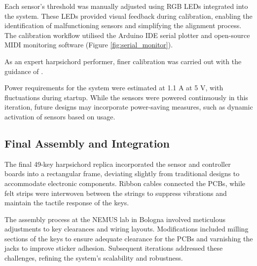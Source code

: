 Each sensor's threshold was manually adjusted using RGB LEDs integrated into the system. These LEDs provided visual feedback during calibration, enabling the identification of malfunctioning sensors and simplifying the alignment process. The calibration workflow utilised the Arduino IDE serial plotter and open-source MIDI monitoring software (Figure \ref{fig:serial_monitor}). 


As an expert harpsichord performer, finer calibration was carried out with the guidance of .

Power requirements for the system were estimated at 1.1 A at 5 V, with fluctuations during startup. While the sensors were powered continuously in this iteration, future designs may incorporate power-saving measures, such as dynamic activation of sensors based on usage.

\subsection{Final Assembly and Integration}

The final 49-key harpsichord replica incorporated the sensor and controller boards into a rectangular frame, deviating slightly from traditional designs to accommodate electronic components. Ribbon cables connected the PCBs, while felt strips were interwoven between the strings to suppress vibrations and maintain the tactile response of the keys.

The assembly process at the NEMUS lab in Bologna involved meticulous adjustments to key clearances and wiring layouts. Modifications included milling sections of the keys to ensure adequate clearance for the PCBs and varnishing the jacks to improve sticker adhesion. Subsequent iterations addressed these challenges, refining the system’s scalability and robustness.





